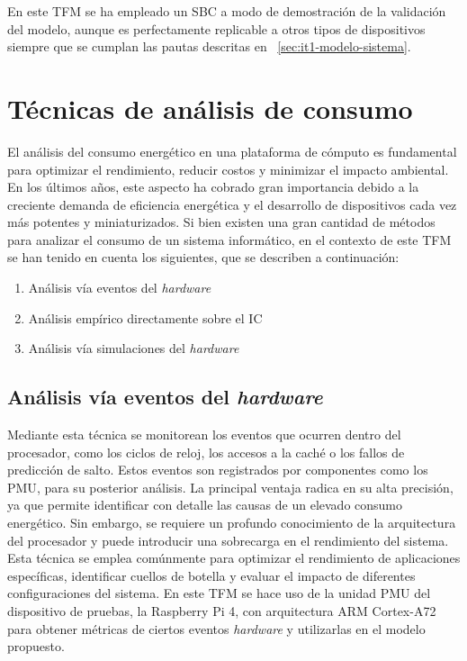 En este \ac{TFM} se ha empleado un \ac{SBC} a modo de demostración de la validación del modelo, aunque es perfectamente replicable a otros tipos de dispositivos siempre que se cumplan las pautas descritas en ~\ref{sec:it1-modelo-sistema}.

\section{Técnicas de análisis de consumo}

El análisis del consumo energético en una plataforma de cómputo es fundamental para optimizar el rendimiento, reducir costos y minimizar el impacto ambiental. En los últimos años, este aspecto ha cobrado gran importancia debido a la creciente demanda de eficiencia energética y el desarrollo de dispositivos cada vez más potentes y miniaturizados. Si bien existen una gran cantidad de métodos para analizar el consumo de un sistema informático, en el contexto de este \ac{TFM} se han tenido en cuenta los siguientes, que se describen a continuación:
\begin{enumerate}
    \item Análisis vía eventos del \textit{hardware}
    \item Análisis empírico directamente sobre el \ac{IC}
    \item Análisis vía simulaciones del \textit{hardware}
\end{enumerate}
 
\subsection{Análisis vía eventos del \textit{hardware}}
\label{subs:papi}
Mediante esta técnica se monitorean los eventos que ocurren dentro del procesador, como los ciclos de reloj, los accesos a la caché o los fallos de predicción de salto. Estos eventos son registrados por componentes como los \ac{PMU}, para su posterior análisis. La principal ventaja radica en su alta precisión, ya que permite identificar con detalle las causas de un elevado consumo energético. Sin embargo, se requiere un profundo conocimiento de la arquitectura del procesador y puede introducir una sobrecarga en el rendimiento del sistema. Esta técnica se emplea comúnmente para optimizar el rendimiento de aplicaciones específicas, identificar cuellos de botella y evaluar el impacto de diferentes configuraciones del sistema. En este \ac{TFM} se hace uso de la unidad \ac{PMU} del dispositivo de pruebas, la Raspberry Pi 4, con arquitectura \ac{ARM} Cortex-A72 para obtener métricas de ciertos eventos \textit{hardware} y utilizarlas en el modelo propuesto.


